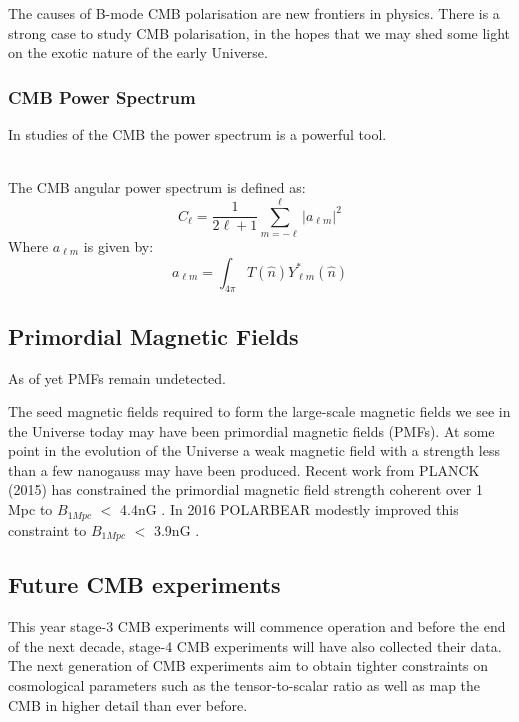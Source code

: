 The causes of B-mode CMB polarisation are new frontiers in physics. There is a strong case to study CMB polarisation, in the hopes that we may shed some light on the exotic nature of the early Universe.

\subsubsection*{CMB Power Spectrum}

In studies of the CMB the power spectrum is a powerful tool. 

\\
The CMB angular power spectrum is defined as:
\begin{equation}
C_{\ell} = \frac{1}{2\ell + 1} \sum_{m = -\ell}^{\ell} \vert a_{\ell m} \vert ^2
\end{equation}
Where $a_{\ell m}$ is given by:
\begin{equation}
a_{\ell m} = \int_{4 \pi} T(\hat{n}) Y_{\ell m}^{*}(\hat{n})
\end{equation}


\subsection{Primordial Magnetic Fields}

As of yet PMFs remain undetected. 

The seed magnetic fields required to form the large-scale magnetic fields we see in the Universe today may have been primordial magnetic fields (PMFs). At some point in the evolution of the Universe a weak magnetic field with a strength less than a few nanogauss may have been produced. Recent work from PLANCK (2015) has constrained the primordial magnetic field strength coherent over 1 Mpc to $B_{1Mpc}$ $<$ 4.4nG \cite{Ade:2015cva}. In 2016 POLARBEAR modestly improved this constraint to $B_{1Mpc}$ $<$ 3.9nG \cite{Ade:2015cao}.

\iffalse
	- seed magnetic field produced in the early universe
	- undetected
	- predicted magnitude of < 1 nG.
	- evolves through magnetohydrodynamical processes
\fi


\subsection{Future CMB experiments}
This year stage-3 CMB experiments will commence operation and before the end of the next decade, stage-4 CMB experiments will have also collected their data. The next generation of CMB experiments aim to obtain tighter constraints on cosmological parameters such as the tensor-to-scalar ratio as well as map the CMB in higher detail than ever before. 

